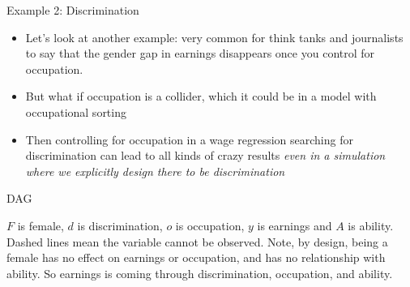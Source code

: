 \begin{frame}{Example 2: Discrimination}

  \begin{itemize}
    \item Let's look at another example: very common for think tanks and journalists to say that the gender gap in earnings disappears once you control for occupation.
    \item But what if occupation is a collider, which it could be in a model with occupational sorting
    \item Then controlling for occupation in a wage regression searching for discrimination can lead to all kinds of crazy results \emph{even in a simulation where we explicitly design there to be discrimination}
  \end{itemize}

\end{frame}

\begin{frame}{DAG}

  \begin{center}
  \end{center}

  $F$ is female, $d$ is discrimination, $o$ is occupation, $y$ is earnings and $A$ is ability. Dashed lines mean the variable cannot be observed. Note, by design, being a female has no effect on earnings or occupation, and has no relationship with ability. So earnings is coming through discrimination, occupation, and ability.

\end{frame}


